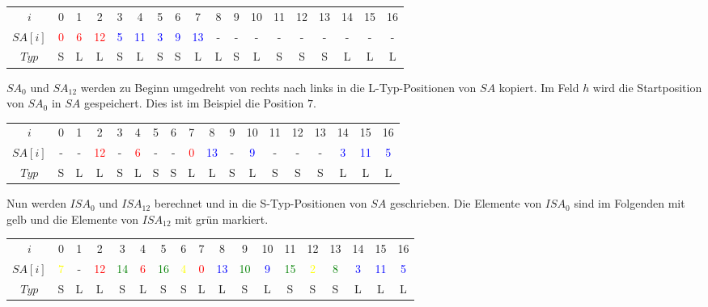 \begin{table}[H]
	\centering
	\begin{tabular}{c| c c c c c c c c c c c c c c c c c}
		$i$ & 0 & 1 & 2 & 3 & 4 & 5 & 6 & 7 & 8 & 9 & 10 & 11 & 12 & 13 & 14 & 15 & 16 \\
		$SA[i]$ & \textcolor{red}{0} & \textcolor{red}{6} & \textcolor{red}{12} & \textcolor{blue}{5} & \textcolor{blue}{11} & \textcolor{blue}{3} & \textcolor{blue}{9} & \textcolor{blue}{13} & - & - & - & - & - & - & - & - & - \\
		$Typ$ & S & L & L & S & L & S & S & L & L & S & L & S & S & S & L & L & L
	\end{tabular}
\end{table}

$SA_0$ und $SA_{12}$ werden zu Beginn umgedreht von rechts nach links in die L-Typ-Positionen von $SA$ kopiert. Im Feld $h$ wird die Startposition von $SA_0$ in $SA$ gespeichert. Dies ist im Beispiel die Position $7$.

\begin{table}[H]
	\centering
	\begin{tabular}{c| c c c c c c c c c c c c c c c c c}
		$i$ & 0 & 1 & 2 & 3 & 4 & 5 & 6 & 7 & 8 & 9 & 10 & 11 & 12 & 13 & 14 & 15 & 16 \\
		$SA[i]$ & - & - & \textcolor{red}{12} & - & \textcolor{red}{6} & - & - & \textcolor{red}{0} & \textcolor{blue}{13} & - & \textcolor{blue}{9} & - & - & - & \textcolor{blue}{3} & \textcolor{blue}{11} & \textcolor{blue}{5} \\
		$Typ$ & S & L & L & S & L & S & S & L & L & S & L & S & S & S & L & L & L
	\end{tabular}
\end{table}

Nun werden $ISA_0$ und $ISA_{12}$ berechnet und in die S-Typ-Positionen von $SA$ geschrieben. Die Elemente von $ISA_0$ sind im Folgenden mit gelb und die Elemente von $ISA_{12}$ mit grün markiert.

\begin{table}[H]
	\centering
	\begin{tabular}{c| c c c c c c c c c c c c c c c c c}
		$i$ & 0 & 1 & 2 & 3 & 4 & 5 & 6 & 7 & 8 & 9 & 10 & 11 & 12 & 13 & 14 & 15 & 16 \\
		$SA[i]$ & \textcolor{yellow}{7} & - & \textcolor{red}{12} & \textcolor{green}{14} & \textcolor{red}{6} & \textcolor{green}{16} & \textcolor{yellow}{4} & \textcolor{red}{0} & \textcolor{blue}{13} & \textcolor{green}{10} & \textcolor{blue}{9} & \textcolor{green}{15} & \textcolor{yellow}{2} & \textcolor{green}{8} & \textcolor{blue}{3} & \textcolor{blue}{11} & \textcolor{blue}{5} \\
		$Typ$ & S & L & L & S & L & S & S & L & L & S & L & S & S & S & L & L & L
	\end{tabular}
\end{table}

